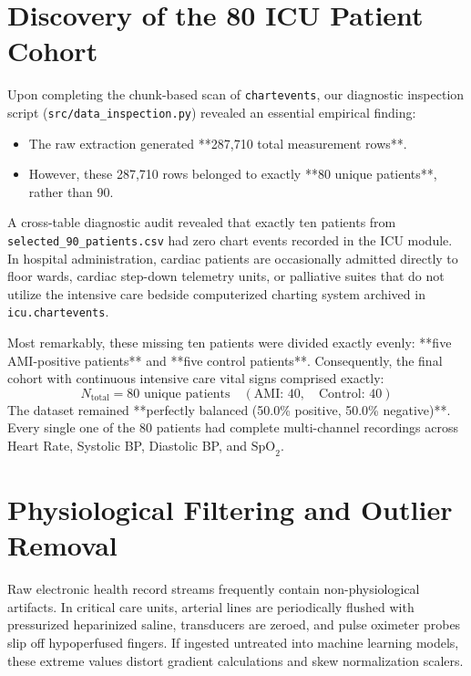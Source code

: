 \documentclass[12pt,a4paper,oneside]{report}
\begin{document}
\section{Discovery of the 80 ICU Patient Cohort}
\label{sec:discovery_80_patients}

Upon completing the chunk-based scan of \texttt{chartevents}, our diagnostic inspection script (\texttt{src/data\_inspection.py}) revealed an essential empirical finding:
\begin{itemize}
    \item The raw extraction generated **287,710 total measurement rows**.
    \item However, these 287,710 rows belonged to exactly **80 unique patients**, rather than 90.
\end{itemize}

A cross-table diagnostic audit revealed that exactly ten patients from \texttt{selected\_90\_patients.csv} had zero chart events recorded in the ICU module. In hospital administration, cardiac patients are occasionally admitted directly to floor wards, cardiac step-down telemetry units, or palliative suites that do not utilize the intensive care bedside computerized charting system archived in \texttt{icu.chartevents}. 

Most remarkably, these missing ten patients were divided exactly evenly: **five AMI-positive patients** and **five control patients**. Consequently, the final cohort with continuous intensive care vital signs comprised exactly:
\begin{equation}
N_{\text{total}} = 80 \text{ unique patients} \quad (\text{AMI: } 40, \quad \text{Control: } 40)
\end{equation}
The dataset remained **perfectly balanced (50.0\% positive, 50.0\% negative)**. Every single one of the 80 patients had complete multi-channel recordings across Heart Rate, Systolic BP, Diastolic BP, and $\text{SpO}_2$.

\section{Physiological Filtering and Outlier Removal}
\label{sec:physio_filtering}

Raw electronic health record streams frequently contain non-physiological artifacts. In critical care units, arterial lines are periodically flushed with pressurized heparinized saline, transducers are zeroed, and pulse oximeter probes slip off hypoperfused fingers. If ingested untreated into machine learning models, these extreme values distort gradient calculations and skew normalization scalers.
\end{document}
